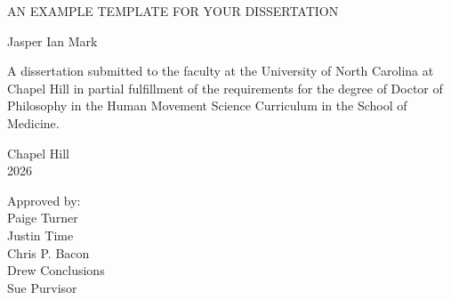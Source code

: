 \begin{titlepage}
\begin{center}


\vspace{2in}
\begin{singlespace}

AN EXAMPLE TEMPLATE FOR YOUR DISSERTATION

\end{singlespace}


\vspace{61pt} %
\large Jasper Ian Mark
\end{center}



\vspace{30pt}
\begin{singlespace}
\begin{center}
\noindent \large
A dissertation submitted to the faculty at the University of North Carolina at Chapel Hill
in partial fulfillment of the requirements for the degree of Doctor of Philosophy in the Human Movement Science Curriculum in the School of Medicine. 
\end{center}
\end{singlespace}

\vspace{39pt}
\begin{center}
\begin{singlespace} \large
Chapel Hill\\
2026
\end{singlespace}
\end{center}


\vspace{39pt}
\begin{flushright}
\begin{minipage}[t]{1.5in} \large
Approved by:\\
Paige Turner \\
Justin Time \\
Chris P. Bacon \\
Drew Conclusions \\
Sue Purvisor
\end{minipage}
\end{flushright}

\end{titlepage}